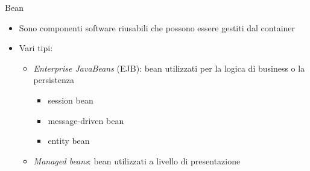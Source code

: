 \begin{frame}{Bean}

\begin{itemize}
\item Sono componenti software riusabili che possono essere gestiti dal container

\vspace{1em}

\item Vari tipi:
	\begin{itemize}
	
	\vspace{0.8em}
	
	\item \textsl{Enterprise JavaBeans} (EJB): bean utilizzati per la logica di business o la persistenza
		\begin{itemize}
		
		\vspace{0.5em}
		
		\item session bean
		
		\vspace{0.3em}
		
		\item message-driven bean
		
		\vspace{0.3em}
		
		\item entity bean
		\end{itemize}
	
	\vspace{0.8em}
	
	\item  \textsl{Managed beans}: bean utilizzati a livello di presentazione
	\end{itemize}

\end{itemize}

\end{frame}


